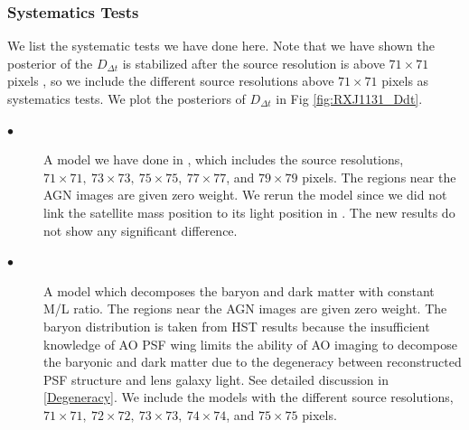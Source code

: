 \documentclass[useAMS,usenatbib]{mnras}
\newcommand\todo[1]{\textcolor{red}{#1}}
\newcommand{\Ddt}{D_{\Delta t}}
\begin{document}
\subsubsection{Systematics Tests}
We list the systematic tests we have done here. Note that we have shown the posterior of the $\Ddt$ is stabilized after the source resolution is above $71\times71$ pixels \citep{GChenEtal16}, so we include the different source resolutions above $71\times71$ pixels as systematics tests. We plot the posteriors of $\Ddt$ in Fig \ref{fig:RXJ1131_Ddt}.
\begin{description}
  \item[$\bullet$] A model we have done in \cite{GChenEtal16}, which includes the source resolutions, $71\times71,~73\times73,~75\times75,~77\times77$, and $79\times79$ pixels.  
  The regions near the AGN images are given zero weight. We rerun the model since we did not link the satellite mass position to its light position in \citet{GChenEtal16}. The new results do not show any significant difference.
  \item[$\bullet$] A model which decomposes the baryon and dark matter with constant M/L ratio. 
  The regions near the AGN images are given zero weight.
  The baryon distribution is taken from HST results because the insufficient knowledge of AO PSF wing limits the ability of AO imaging to decompose the baryonic and dark matter due to the degeneracy between reconstructed PSF structure and lens galaxy light. See detailed discussion in \ref{Degeneracy}. We include the models with the different source resolutions, $71\times71,~72\times72,~73\times73,~74\times74$, and $75\times75$ pixels.
\end{description}
\end{document}
